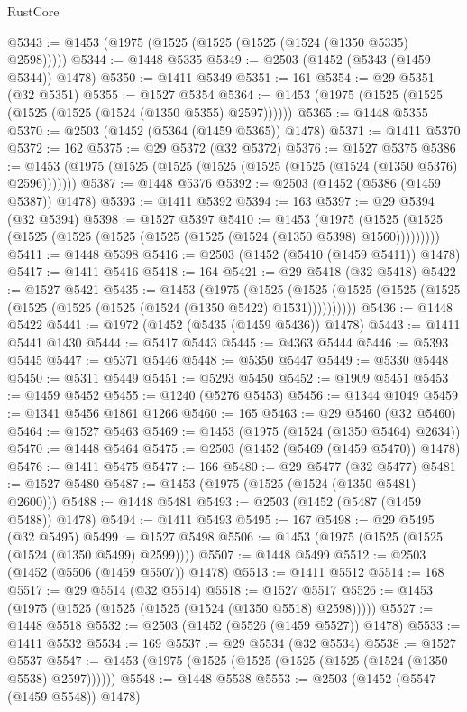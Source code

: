 \begin{lexlean}{RustCore}
\begin{coremodule}
@5343 := @1453 (@1975 (@1525 (@1525 (@1525 (@1524 (@1350 @5335) @2598)))))
@5344 := @1448 @5335
@5349 := @2503 (@1452 (@5343 (@1459 @5344)) @1478)
@5350 := @1411 @5349
@5351 := 161
@5354 := @29 @5351 (@32 @5351)
@5355 := @1527 @5354
@5364 := @1453 (@1975 (@1525 (@1525 (@1525 (@1525 (@1524 (@1350 @5355) @2597))))))
@5365 := @1448 @5355
@5370 := @2503 (@1452 (@5364 (@1459 @5365)) @1478)
@5371 := @1411 @5370
@5372 := 162
@5375 := @29 @5372 (@32 @5372)
@5376 := @1527 @5375
@5386 := @1453 (@1975 (@1525 (@1525 (@1525 (@1525 (@1525 (@1524 (@1350 @5376) @2596)))))))
@5387 := @1448 @5376
@5392 := @2503 (@1452 (@5386 (@1459 @5387)) @1478)
@5393 := @1411 @5392
@5394 := 163
@5397 := @29 @5394 (@32 @5394)
@5398 := @1527 @5397
@5410 := @1453
    (@1975 (@1525 (@1525 (@1525 (@1525 (@1525 (@1525 (@1525 (@1524 (@1350 @5398) @1560)))))))))
@5411 := @1448 @5398
@5416 := @2503 (@1452 (@5410 (@1459 @5411)) @1478)
@5417 := @1411 @5416
@5418 := 164
@5421 := @29 @5418 (@32 @5418)
@5422 := @1527 @5421
@5435 := @1453
    (@1975
      (@1525 (@1525 (@1525 (@1525 (@1525 (@1525 (@1525 (@1525 (@1524 (@1350 @5422) @1531))))))))))
@5436 := @1448 @5422
@5441 := @1972 (@1452 (@5435 (@1459 @5436)) @1478)
@5443 := @1411 @5441 @1430
@5444 := @5417 @5443
@5445 := @4363 @5444
@5446 := @5393 @5445
@5447 := @5371 @5446
@5448 := @5350 @5447
@5449 := @5330 @5448
@5450 := @5311 @5449
@5451 := @5293 @5450
@5452 := @1909 @5451
@5453 := @1459 @5452
@5455 := @1240 (@5276 @5453)
@5456 := @1344 @1049
@5459 := @1341 @5456 @1861 @1266
@5460 := 165
@5463 := @29 @5460 (@32 @5460)
@5464 := @1527 @5463
@5469 := @1453 (@1975 (@1524 (@1350 @5464) @2634))
@5470 := @1448 @5464
@5475 := @2503 (@1452 (@5469 (@1459 @5470)) @1478)
@5476 := @1411 @5475
@5477 := 166
@5480 := @29 @5477 (@32 @5477)
@5481 := @1527 @5480
@5487 := @1453 (@1975 (@1525 (@1524 (@1350 @5481) @2600)))
@5488 := @1448 @5481
@5493 := @2503 (@1452 (@5487 (@1459 @5488)) @1478)
@5494 := @1411 @5493
@5495 := 167
@5498 := @29 @5495 (@32 @5495)
@5499 := @1527 @5498
@5506 := @1453 (@1975 (@1525 (@1525 (@1524 (@1350 @5499) @2599))))
@5507 := @1448 @5499
@5512 := @2503 (@1452 (@5506 (@1459 @5507)) @1478)
@5513 := @1411 @5512
@5514 := 168
@5517 := @29 @5514 (@32 @5514)
@5518 := @1527 @5517
@5526 := @1453 (@1975 (@1525 (@1525 (@1525 (@1524 (@1350 @5518) @2598)))))
@5527 := @1448 @5518
@5532 := @2503 (@1452 (@5526 (@1459 @5527)) @1478)
@5533 := @1411 @5532
@5534 := 169
@5537 := @29 @5534 (@32 @5534)
@5538 := @1527 @5537
@5547 := @1453 (@1975 (@1525 (@1525 (@1525 (@1525 (@1524 (@1350 @5538) @2597))))))
@5548 := @1448 @5538
@5553 := @2503 (@1452 (@5547 (@1459 @5548)) @1478)

\end{coremodule}
\end{lexlean}
